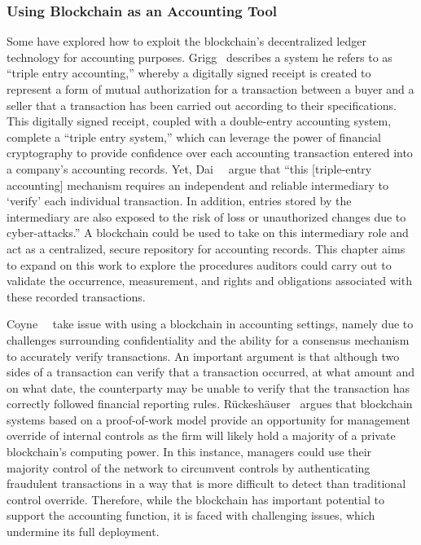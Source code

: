 \subsubsection{Using Blockchain as an Accounting Tool}
Some have explored how to exploit the blockchain's decentralized ledger technology for accounting purposes. Grigg~\cite{grigg2005triple} describes a system he refers to as ``triple entry accounting,'' whereby a digitally signed receipt is created to represent a form of mutual authorization for a transaction between a buyer and a seller that a transaction has been carried out according to their specifications. This digitally signed receipt, coupled with a double-entry accounting system, complete a ``triple entry system,'' which can leverage the power of financial cryptography to provide confidence over each accounting transaction entered into a company's accounting records. Yet, Dai~\etal~\cite{dai2017toward} argue that ``this [triple-entry accounting] mechanism requires an independent and reliable intermediary to ‘verify’ each individual transaction. In addition, entries stored by the intermediary are also exposed to the risk of loss or unauthorized changes due to cyber-attacks.'' A blockchain could be used to take on this intermediary role and act as a centralized, secure repository for accounting records. This chapter aims to expand on this work to explore the procedures auditors could carry out to validate the occurrence, measurement, and rights and obligations associated with these recorded transactions.

Coyne~\etal~\cite{coyne2017can} take issue with using a blockchain in accounting settings, namely due to challenges surrounding confidentiality and the ability for a consensus mechanism to accurately verify transactions. An important argument is that although two sides of a transaction can verify that a transaction occurred, at what amount and on what date, the counterparty may be unable to verify that the transaction has correctly followed financial reporting rules. Rückeshäuser~\cite{ruckeshauser2017we} argues that blockchain systems based on a proof-of-work model provide an opportunity for management override of internal controls as the firm will likely hold a majority of a private blockchain's computing power. In this instance, managers could use their majority control of the network to circumvent controls by authenticating fraudulent transactions in a way that is more difficult to detect than traditional control override. Therefore, while the blockchain has important potential to support the accounting function, it is faced with challenging issues, which undermine its full deployment.

